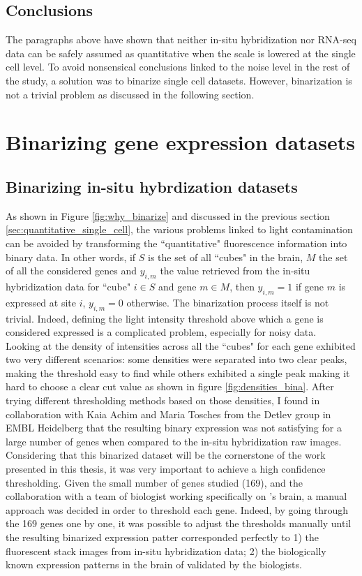 	\subsection{Conclusions}
	The paragraphs above have shown that neither in-situ hybridization nor RNA-seq data can be safely assumed as quantitative when the scale is lowered at the single cell level. To avoid nonsensical conclusions linked to the noise level in the rest of the study, a solution was to binarize single cell datasets. However, binarization is not a trivial problem as discussed in the following section.



\section{Binarizing gene expression datasets}\label{sec:binarizing}
  \subsection{Binarizing in-situ hybrdization datasets}
	As shown in Figure \ref{fig:why_binarize} and discussed in the previous section \ref{sec:quantitative_single_cell}, the various problems linked to light contamination can be avoided by transforming the ``quantitative" fluorescence information into binary data. In other words, if $S$ is the set of all ``cubes" in the brain, $M$ the set of all the considered genes and $y_{i,m}$ the value retrieved from the in-situ hybridization data for ``cube" $i \in S$ and gene $m \in M$, then  $y_{i,m} = 1$ if gene $m$ is expressed at site $i$, $y_{i,m} = 0$ otherwise. The binarization process itself is not trivial. Indeed, defining the light intensity threshold above which a gene is considered expressed is a complicated problem, especially for noisy data.\\

	Looking at the density of intensities across all the ``cubes" for each gene exhibited two very different scenarios: some densities were separated into two clear peaks, making the threshold easy to find while others exhibited a single peak making it hard to choose a clear cut value as shown in figure \ref{fig:densities_bina}. After trying different thresholding methods based on those densities, I found in collaboration with Kaia Achim and Maria Tosches from the Detlev group in EMBL Heidelberg that the resulting binary expression was not satisfying for a large number of genes when compared to the in-situ hybridization raw images. Considering that this binarized dataset will be the cornerstone of the work presented in this thesis, it was very important to achieve a high confidence thresholding. Given the small number of genes studied (169), and the collaboration with a team of biologist working specifically on \platyfull{}'s brain, a manual approach was decided in order to threshold each gene. Indeed, by going through the 169 genes one by one, it was possible to adjust the thresholds manually until the resulting binarized expression patter corresponded perfectly to 1) the fluorescent stack images from in-situ hybridization data; 2) the biologically known expression patterns in the brain of \platy{} validated by the biologists.\\
	
